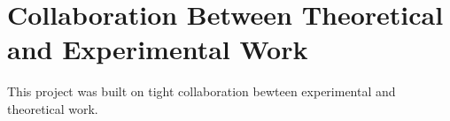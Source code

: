 \section{Collaboration Between Theoretical and Experimental Work}
\label{sec:cooperation}

This project was built on tight collaboration bewteen experimental and theoretical work.

\placeholder
